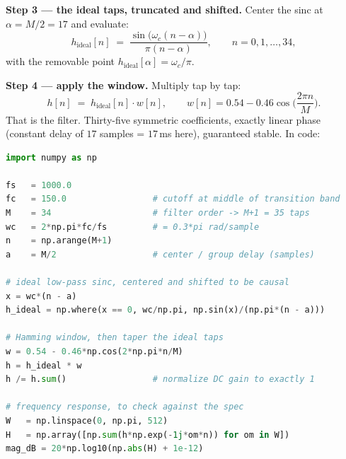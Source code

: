 \textbf{Step 3 --- the ideal taps, truncated and shifted.} Center the sinc at
$\alpha = M/2 = 17$ and evaluate:
\[
h_{\text{ideal}}[n] \;=\; \frac{\sin\!\big(\omega_c (n-\alpha)\big)}{\pi (n-\alpha)},
\qquad n = 0, 1, \dots, 34,
\]
with the removable point $h_{\text{ideal}}[\alpha] = \omega_c/\pi$.

\textbf{Step 4 --- apply the window.} Multiply tap by tap:
\[
h[n] \;=\; h_{\text{ideal}}[n]\cdot w[n], \qquad
w[n] = 0.54 - 0.46\cos\!\Big(\frac{2\pi n}{M}\Big).
\]
That is the filter. Thirty-five symmetric coefficients, exactly linear phase
(constant delay of $17$ samples = $17$\,ms here), guaranteed stable. In code:

\begin{lstlisting}[language=Python]
import numpy as np

fs   = 1000.0
fc   = 150.0                 # cutoff at middle of transition band
M    = 34                    # filter order -> M+1 = 35 taps
wc   = 2*np.pi*fc/fs         # = 0.3*pi rad/sample
n    = np.arange(M+1)
a    = M/2                   # center / group delay (samples)

# ideal low-pass sinc, centered and shifted to be causal
x = wc*(n - a)
h_ideal = np.where(x == 0, wc/np.pi, np.sin(x)/(np.pi*(n - a)))

# Hamming window, then taper the ideal taps
w = 0.54 - 0.46*np.cos(2*np.pi*n/M)
h = h_ideal * w
h /= h.sum()                 # normalize DC gain to exactly 1

# frequency response, to check against the spec
W   = np.linspace(0, np.pi, 512)
H   = np.array([np.sum(h*np.exp(-1j*om*n)) for om in W])
mag_dB = 20*np.log10(np.abs(H) + 1e-12)
\end{lstlisting}

